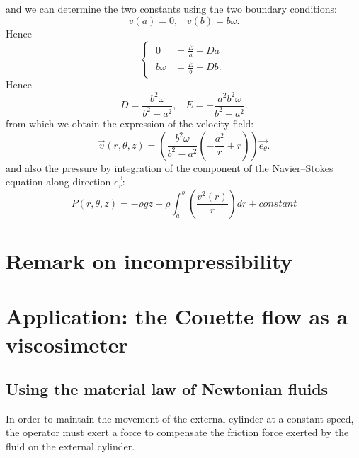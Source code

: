 \documentclass[DIV=12]{article}
\newcommand{\etheta}{\vec{e_\theta}}
\newcommand{\er}{\vec{e_r}}
\begin{document}
 and we can determine the two constants using the two boundary conditions:
\begin{equation}
 v( a ) = 0,\;\;\; v( b ) = b\omega.
\end{equation}
 Hence
\begin{equation}
 \begin{cases}
  \begin{array}{ll}  
  0 & = \frac{E}{a} + Da \\
  b\omega & = \frac{E}{b} + Db.
 \end{array}
\end{cases} 
 \end{equation}
Hence
 \begin{equation}
 D = \frac{b^2\omega}{b^2 - a^2},\;\;\; E = -\frac{a^2b^2\omega}{ b^2 - a^2}.
 \end{equation}
 from which we obtain the expression of the velocity field:
\begin{equation}
\boxed{
\vec{v}(r,\theta,z) = \left( \frac{b^2\omega}{ b^2 - a^2}\left( -\frac{a^2}{r} + r \right) \right) \etheta.}
\end{equation}
 and also the pressure by integration of the component of the Navier--Stokes equation along direction $\er$:
\begin{equation}
P(r,\theta,z) = -\rho g z + \rho\int_a^b\left( \frac{v^2(r)}{r}\right)dr + constant
\end{equation}


\section{Remark on incompressibility}


\section{Application: the Couette flow as a viscosimeter}

\subsection{Using the material law of Newtonian fluids}
 In order to maintain the movement of the external cylinder at a constant
 speed, the operator must exert a force to compensate the friction 
 force exerted by the fluid on the external cylinder.\\
\end{document}
